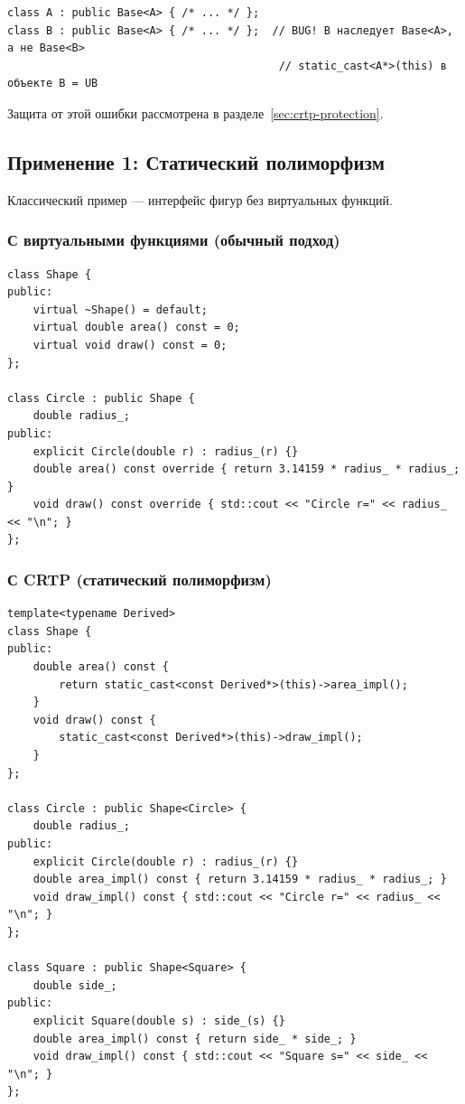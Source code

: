 \documentclass[a4paper,12pt]{article}
\begin{document}
\begin{lstlisting}
class A : public Base<A> { /* ... */ };
class B : public Base<A> { /* ... */ };  // BUG! B наследует Base<A>, а не Base<B>
                                          // static_cast<A*>(this) в объекте B = UB
\end{lstlisting}

Защита от этой ошибки рассмотрена в разделе~\ref{sec:crtp-protection}.

\subsection{Применение 1: Статический полиморфизм}

Классический пример --- интерфейс фигур без виртуальных функций.

\subsubsection{С виртуальными функциями (обычный подход)}

\begin{lstlisting}
class Shape {
public:
    virtual ~Shape() = default;
    virtual double area() const = 0;
    virtual void draw() const = 0;
};

class Circle : public Shape {
    double radius_;
public:
    explicit Circle(double r) : radius_(r) {}
    double area() const override { return 3.14159 * radius_ * radius_; }
    void draw() const override { std::cout << "Circle r=" << radius_ << "\n"; }
};
\end{lstlisting}

\subsubsection{С CRTP (статический полиморфизм)}

\begin{lstlisting}
template<typename Derived>
class Shape {
public:
    double area() const {
        return static_cast<const Derived*>(this)->area_impl();
    }
    void draw() const {
        static_cast<const Derived*>(this)->draw_impl();
    }
};

class Circle : public Shape<Circle> {
    double radius_;
public:
    explicit Circle(double r) : radius_(r) {}
    double area_impl() const { return 3.14159 * radius_ * radius_; }
    void draw_impl() const { std::cout << "Circle r=" << radius_ << "\n"; }
};

class Square : public Shape<Square> {
    double side_;
public:
    explicit Square(double s) : side_(s) {}
    double area_impl() const { return side_ * side_; }
    void draw_impl() const { std::cout << "Square s=" << side_ << "\n"; }
};
\end{lstlisting}
\end{document}
